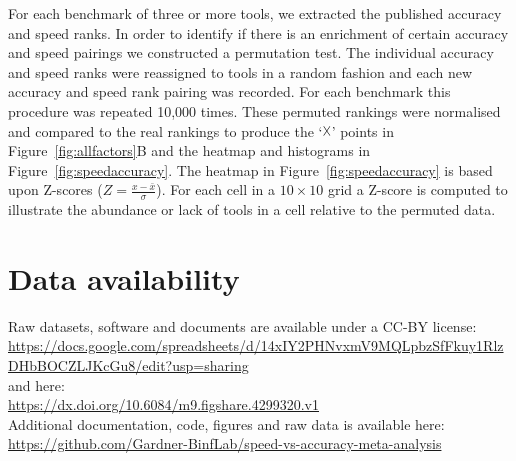 \documentclass[fleqn,10pt]{SelfArx} %
\begin{document}
%
%


For each benchmark of three or more tools, we extracted the published
accuracy and speed ranks. In order to identify if there is an
enrichment of certain accuracy and speed pairings we constructed a
permutation test. The individual accuracy and speed ranks were
reassigned to tools in a random fashion and each new accuracy and
speed rank pairing was recorded. For each benchmark this procedure was
repeated 10,000 times. These permuted rankings were normalised and
compared to the real rankings to produce the ‘$\vartimes$’ points in
Figure~\ref{fig:allfactors}B and the heatmap and histograms in
Figure~\ref{fig:speedaccuracy}. The heatmap in
Figure~\ref{fig:speedaccuracy} is based upon Z-scores
($Z=\frac{x-\bar{x}}{\sigma}$). For each cell in a $10\times 10$ grid
a Z-score is computed to illustrate the abundance or lack of tools in
a cell relative to the permuted data.

\section*{Data availability}
Raw datasets, software and documents are available under a CC-BY license:\\
\fussy
\url{https://docs.google.com/spreadsheets/d/14xIY2PHNvxmV9MQLpbzSfFkuy1RlzDHbBOCZLJKcGu8/edit?usp=sharing}\\
and here:\\
\fussy
\url{https://dx.doi.org/10.6084/m9.figshare.4299320.v1}\\
\sloppy
Additional documentation, code, figures and raw data is available here:\\
\fussy
\url{https://github.com/Gardner-BinfLab/speed-vs-accuracy-meta-analysis}
\sloppy
\end{document}
